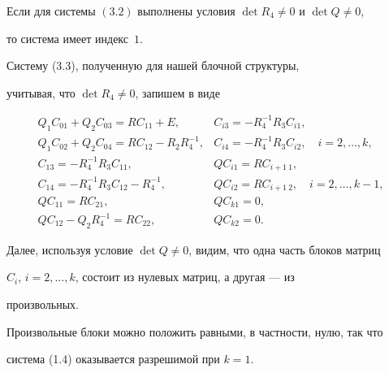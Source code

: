  


\begin{thms} 


Если для системы $(3.2)$ выполнены условия $\det R_4\ne0$ и $\det Q\ne0$, 


то система имеет индекс~$1$. 


\end{thms} 


 


\begin{pf} 


Систему (3.3), полученную для нашей блочной структуры, 


учитывая, что $\det R_4\ne0$, запишем в виде 


\begin{equation} 


\begin{array}{ll} 


Q_1C_{01}+Q_2C_{03}=RC_{11}+E, & %


C_{i3}=-R^{-1}_4R_3C_{i1},\\[2mm] 


Q_1C_{02}+Q_2C_{04}=RC_{12}-R_2R^{-1}_4, & %


C_{i4}=-R^{-1}_4R_3C_{i2},\quad i=2,\dotsc,k,\\[2mm] 


C_{13}=-R^{-1}_4R_3C_{11}, & %


QC_{i1}=RC_{i+1\ 1},\\[2mm] 


C_{14}=-R^{-1}_4R_3C_{12}-R^{-1}_4, & %


QC_{i2}=RC_{i+1\ 2},\quad i=2,\dotsc,k-1,\\[2mm] 


QC_{11}=RC_{21}, & %


QC_{k1}=0,\\[2mm] 


QC_{12}-Q_2R^{-1}_4=RC_{22}, & %


QC_{k2}=0. 


\end{array} 


\end{equation} 


Далее, используя условие $\det Q\ne0$, видим, что одна часть блоков матриц 


$C_i$, $i=2,\dotsc,k$, состоит из нулевых матриц, а другая --- из 


произвольных. 


Произвольные блоки можно положить равными, в частности, нулю, так что 


система (1.4) оказывается разрешимой при $k=1$. 


\end{pf} 


